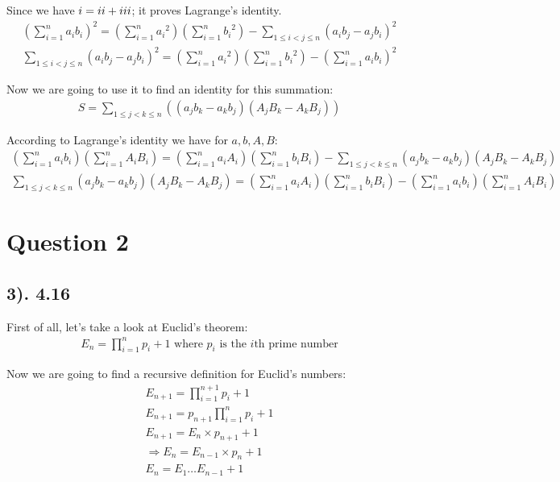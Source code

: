\documentclass[12pt]{article}
\newcommand{\RNum}[1]{\uppercase\expandafter{\romannumeral #1\relax}}
\begin{document}
Since we have $\RNum{1} = \RNum{2} + \RNum{3}$; it proves Lagrange's identity.
\begin{gather*}
    {(\sum_{i=1}^n a_{i}b_{i})}^2 = (\sum_{i=1}^n {a_{i}}^2)(\sum_{i=1}^n {b_{i}}^2) - \sum_{1 \leq i < j \leq n} {(a_{i}b_{j} - a_{j}b_{i})}^2 \\
    \sum_{1 \leq i < j \leq n} {(a_{i}b_{j} - a_{j}b_{i})}^2 = (\sum_{i=1}^n {a_{i}}^2)(\sum_{i=1}^n {b_{i}}^2) - {(\sum_{i=1}^n a_{i}b_{i})}^2
\end{gather*}

Now we are going to use it to find an identity for this summation:
\begin{gather*}
    S = \sum_{1 \leq j < k \leq n} ((a_{j}b_{k} - a_{k}b_{j})(A_{j}B_{k} - A_{k}B_{j}))
\end{gather*}

According to Lagrange's identity we have for ${a},{b},{A},{B}$:
\begin{gather*}
    (\sum_{i=1}^n a_{i}b_{i})(\sum_{i=1}^n A_{i}B_{i}) = (\sum_{i=1}^n a_{i}A_{i})(\sum_{i=1}^n b_{i}B_{i}) - \sum_{1 \leq j < k \leq n} (a_{j}b_{k} - a_{k}b_{j})(A_{j}B_{k} - A_{k}B_{j}) \\
    \sum_{1 \leq j < k \leq n} (a_{j}b_{k} - a_{k}b_{j})(A_{j}B_{k} - A_{k}B_{j}) = (\sum_{i=1}^n a_{i}A_{i})(\sum_{i=1}^n b_{i}B_{i}) - (\sum_{i=1}^n a_{i}b_{i})(\sum_{i=1}^n A_{i}B_{i})
\end{gather*}

\section*{Question 2}
\subsection*{3). 4.16}
First of all, let's take a look at Euclid's theorem:
\begin{gather*}
    E_{n} = \prod_{i=1}^n p_{i} + 1 \text{ where $p_{i}$ is the $i$th prime number}
\end{gather*}

Now we are going to find a recursive definition for Euclid's numbers:
\begin{gather*}
    E_{n+1} = \prod_{i=1}^{n+1} p_{i} + 1 \\
    E_{n+1} = p_{n+1} \prod_{i=1}^n p_{i} + 1 \\
    E_{n+1} = E_{n} \times p_{n+1} + 1 \\
    \Rightarrow E_{n} = E_{n-1} \times p_{n} + 1 \\
    E_{n} = E_{1} \ldots E_{n-1} + 1
\end{gather*}
\end{document}
